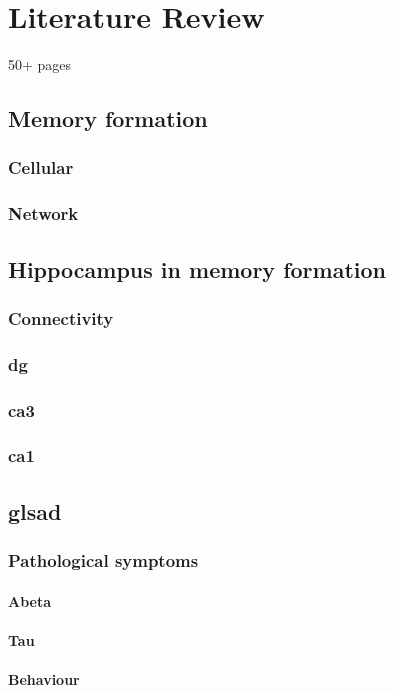 \chapter{Literature Review}
50+ pages

\section{Memory formation}
\subsection{Cellular}
\subsection{Network}

\section{Hippocampus in memory formation}
\subsection{Connectivity}
\subsection{\gls{dg}}
\subsection{\gls{ca3}}
\subsection{\gls{ca1}}

\section{gls{ad}}
\subsection{Pathological symptoms}
\subsubsection{A\textgreek{beta}}
\subsubsection{Tau}
\subsubsection{Behaviour}
